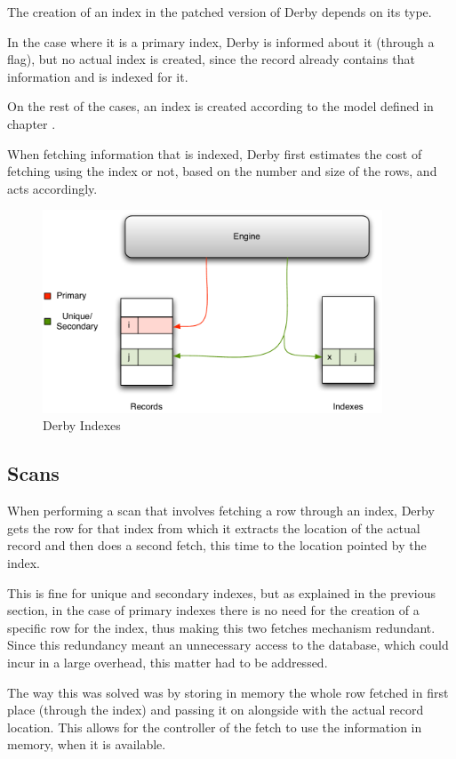 The creation of an index in the patched version of Derby depends on its type. 

In the case where it is a primary index, Derby is informed about it (through a flag), but no actual index is created, since the record already contains that information and is indexed for it.

On the rest of the cases, an index is created according to the model defined in chapter .

When fetching information that is indexed, Derby first estimates the cost of fetching using the index or not, based on the number and size of the rows, and acts accordingly.

\begin{figure}[h]
  \centering    
  \includegraphics[width=0.9\textwidth]{images/derbyindexes}
  \caption{Derby Indexes}
  \label{fig:derbyindexes}
\end{figure}


\subsection{Scans}


When performing a scan that involves fetching a row through an index, Derby gets the row for that index from which it extracts the location of the actual record and then does a second fetch, this time to the location pointed by the index.

This is fine for unique and secondary indexes, but as explained in the previous section, in the case of primary indexes there is no need for the creation of a specific row for the index, thus making this two fetches mechanism redundant. Since this redundancy meant an unnecessary access to the database, which could incur in a large overhead, this matter had to be addressed. 

The way this was solved was by storing in memory the whole row fetched in first place (through the index) and passing it on alongside with the actual record location. This allows for the controller of the fetch to use the information in memory, when it is available.   








